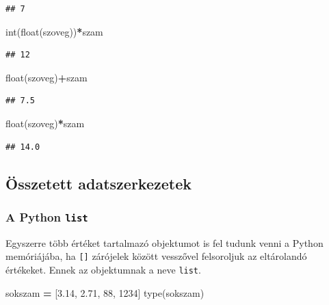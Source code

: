 \documentclass[
]{book}
\newenvironment{Shaded}{\begin{snugshade}}{\end{snugshade}}
\newcommand{\BuiltInTok}[1]{#1}
\newcommand{\DecValTok}[1]{\textcolor[rgb]{0.00,0.00,0.81}{#1}}
\newcommand{\FloatTok}[1]{\textcolor[rgb]{0.00,0.00,0.81}{#1}}
\newcommand{\NormalTok}[1]{#1}
\newcommand{\OperatorTok}[1]{\textcolor[rgb]{0.81,0.36,0.00}{\textbf{#1}}}
\begin{document}
\begin{verbatim}
## 7
\end{verbatim}

\begin{Shaded}
\begin{Highlighting}[]
\BuiltInTok{int}\NormalTok{(}\BuiltInTok{float}\NormalTok{(szoveg))}\OperatorTok{*}\NormalTok{szam}
\end{Highlighting}
\end{Shaded}

\begin{verbatim}
## 12
\end{verbatim}

\begin{Shaded}
\begin{Highlighting}[]
\BuiltInTok{float}\NormalTok{(szoveg)}\OperatorTok{+}\NormalTok{szam}
\end{Highlighting}
\end{Shaded}

\begin{verbatim}
## 7.5
\end{verbatim}

\begin{Shaded}
\begin{Highlighting}[]
\BuiltInTok{float}\NormalTok{(szoveg)}\OperatorTok{*}\NormalTok{szam}
\end{Highlighting}
\end{Shaded}

\begin{verbatim}
## 14.0
\end{verbatim}

\subsection{Összetett adatszerkezetek}\label{uxf6sszetett-adatszerkezetek}

\subsubsection{\texorpdfstring{A Python \texttt{list}}{A Python list}}\label{a-python-list}

Egyszerre több értéket tartalmazó objektumot is fel tudunk venni a Python memóriájába, ha \texttt{{[}{]}} zárójelek között vesszővel felsoroljuk az eltárolandó értékeket. Ennek az objektumnak a neve \texttt{list}.

\begin{Shaded}
\begin{Highlighting}[]
\NormalTok{sokszam }\OperatorTok{=}\NormalTok{ [}\FloatTok{3.14}\NormalTok{, }\FloatTok{2.71}\NormalTok{, }\DecValTok{88}\NormalTok{, }\DecValTok{1234}\NormalTok{]}
\BuiltInTok{type}\NormalTok{(sokszam)}
\end{Highlighting}
\end{Shaded}
\end{document}
